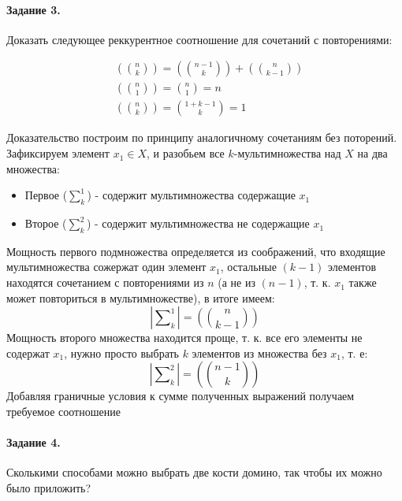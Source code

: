 \documentclass[a4paper,12pt]{article}
\begin{document}
\paragraph{Задание 3.} Доказать следующее реккурентное соотношение для сочетаний с повторениями:

\begin{equation}
	\begin{split}
		& \left( \binom{n}{k} \right) = \left( \binom{n-1}{k} \right) + \left( \binom{n}{k-1} \right) \\
		& \left( \binom{n}{1} \right) = \binom{n}{1} = n \\
		& \left( \binom{n}{k} \right) = \binom{1 + k - 1}{k} = 1
	\end{split}
\end{equation}

\begin{Proof}
	Доказательство построим по принципу аналогичному сочетаниям без поторений. Зафиксируем элемент $x_1 \in X$, и разобьем все $k$-мультимножества над $X$ на два множества:

\begin{itemize}
	\item Первое ($\sum_k^1$) - содержит мультимножества содержащие $x_1$

	\item Второе ($\sum_k^2$) - содержит мультимножества не содержащие $x_1$
\end{itemize}

Мощность первого подмножества определяется из соображений, что входящие мультимножества сожержат один элемент $x_1$, остальные $(k-1)$ элементов находятся сочетанием с повторениями из $n$ (а не из $(n-1)$, т. к. $x_1$ также может повториться в мультимножестве), в итоге имеем:
	\[
		\left| \sum\nolimits_k^1 \right| = \left( \binom{n}{k-1} \right)
	\]
Мощность второго множества находится проще, т. к. все его элементы не содержат $x_1$, нужно просто выбрать $k$ элементов из множества без $x_1$, т. е:
	\[
		\left| \sum\nolimits_k^2 \right| = \left( \binom{n-1}{k} \right)
	\]
Добавляя граничные условия к сумме полученных выражений получаем требуемое соотношение
\end{Proof}

\paragraph{Задание 4.} Сколькими способами можно выбрать две кости домино, так чтобы их можно было приложить?
\end{document}
